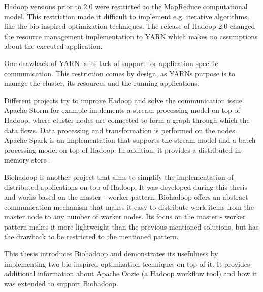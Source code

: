 Hadoop versions prior to 2.0 were restricted to the MapReduce \cite{dean2008mapreduce} computational model. This restriction made it difficult to implement e.g. iterative algorithms, like the bio-inspired optimization techniques. The release of Hadoop 2.0 changed the resource management implementation to YARN \cite{vavilapalli2013apache} which makes no assumptions about the executed application.

One drawback of YARN is its lack of support for application specific communication. This restriction comes by design, as YARNs purpose is to manage the cluster, its resources and the running applications.

Different projects try to improve Hadoop and solve the communication issue. Apache Storm \cite{storm} for example implements a stream processing model on top of Hadoop, where cluster nodes are connected to form a graph through which the data flows. Data processing and transformation is performed on the nodes. Apache Spark \cite{spark} is an implementation that supports the stream model and a batch processing model on top of Hadoop. In addition, it provides a distributed in-memory store \cite{zaharia2012resilient}.

Biohadoop \cite{biohadoop} is another project that aims to simplify the implementation of distributed applications on top of Hadoop. It was developed during this thesis and works based on the master - worker pattern. Biohadoop offers an abstract communication mechanism that makes it easy to distribute work items from the master node to any number of worker nodes. Its focus on the master - worker pattern makes it more lightweight than the previous mentioned solutions, but has the drawback to be restricted to the mentioned pattern.

This thesis introduces Biohadoop and demonstrates its usefulness by implementing two bio-inspired optimization techniques on top of it. It provides additional information about Apache Oozie (a Hadoop workflow tool) \cite{oozie} and how it was extended to support Biohadoop.

